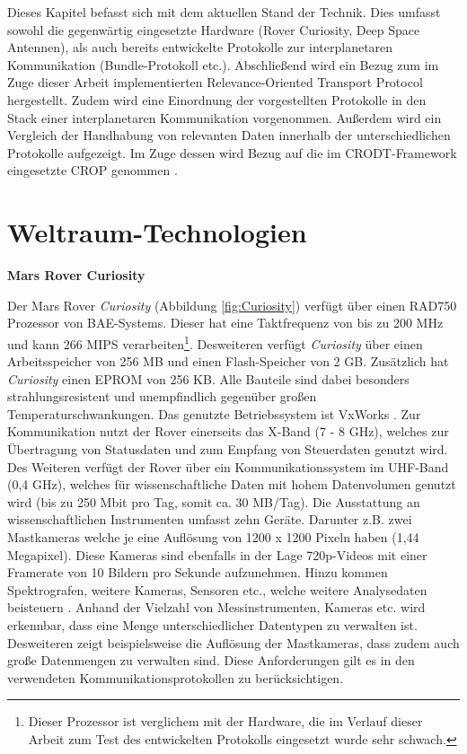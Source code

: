 \label{cap:standDerTechnik}
Dieses Kapitel befasst sich mit dem aktuellen Stand der Technik. Dies
umfasst sowohl die gegenw{\"a}rtig eingesetzte Hardware (Rover Curiosity, Deep
Space Antennen), als auch bereits entwickelte Protokolle zur interplanetaren
Kommunikation (Bundle-Protokoll etc.). Abschlie{\ss}end wird ein Bezug zum im
Zuge dieser Arbeit implementierten Relevance-Oriented Transport Protocol
hergestellt. Zudem wird eine Einordnung der vorgestellten Protokolle in
den Stack einer interplanetaren Kommunikation vorgenommen. Au{\ss}erdem wird ein
Vergleich der Handhabung von relevanten Daten innerhalb der unterschiedlichen
Protokolle aufgezeigt. Im Zuge dessen wird Bezug auf die im CRODT-Framework
eingesetzte \gls{CROP} genommen \cite{Daher}.

\section{Weltraum-Technologien}

\textbf{Mars Rover Curiosity} \newline

Der Mars Rover \textit{Curiosity} (Abbildung \ref{fig:Curiosity}) verf{\"u}gt
{\"u}ber einen RAD750 Prozessor von BAE-Systems.
Dieser hat eine Taktfrequenz von bis zu 200 MHz und kann 266 MIPS
verarbeiten\footnote{Dieser Prozessor ist verglichem mit der Hardware, die im
Verlauf dieser Arbeit zum Test des entwickelten Protokolls eingesetzt wurde
sehr schwach.}. Desweiteren verf{\"u}gt \textit{Curiosity} {\"u}ber einen
Arbeitsspeicher von 256 MB und einen Flash-Speicher von 2 GB. Zus{\"a}tzlich
hat \textit{Curiosity} einen EPROM von 256 KB. Alle Bauteile sind dabei
besonders strahlungsresistent und unempfindlich gegen{\"u}ber gro{\ss}en
Temperaturschwankungen. Das genutzte Betriebssystem ist VxWorks \cite{WR}.
Zur Kommunikation nutzt der Rover einerseits das X-Band (7 - 8 GHz), welches zur
{\"U}bertragung von Statusdaten und zum Empfang von Steuerdaten genutzt wird.
Des Weiteren verf{\"u}gt der Rover {\"u}ber ein Kommunikationssystem im UHF-Band
(0,4 GHz), welches f{\"u}r wissenschaftliche Daten mit hohem Datenvolumen
genutzt wird (bis zu 250 Mbit pro Tag, somit ca. 30 MB/Tag).\newline 
Die Ausstattung an wissenschaftlichen Instrumenten umfasst zehn Ger{\"a}te.
Darunter z.B. zwei Mastkameras welche je eine Aufl{\"o}sung von 1200 x 1200 Pixeln haben (1,44
Megapixel). Diese Kameras sind ebenfalls in der Lage 720p-Videos mit einer
Framerate von 10 Bildern pro Sekunde aufzunehmen. Hinzu kommen Spektrografen,
weitere Kameras, Sensoren etc., welche weitere Analysedaten beisteuern
\cite{web5}. Anhand der Vielzahl von Messinstrumenten, Kameras etc. wird
erkennbar, dass eine Menge unterschiedlicher Datentypen zu verwalten ist.
Desweiteren zeigt beispielsweise die Aufl{\"o}sung der Mastkameras, dass zudem
auch gro{\ss}e Datenmengen zu verwalten sind. Diese Anforderungen gilt es in den
verwendeten Kommunikationsprotokollen zu ber{\"u}cksichtigen.

